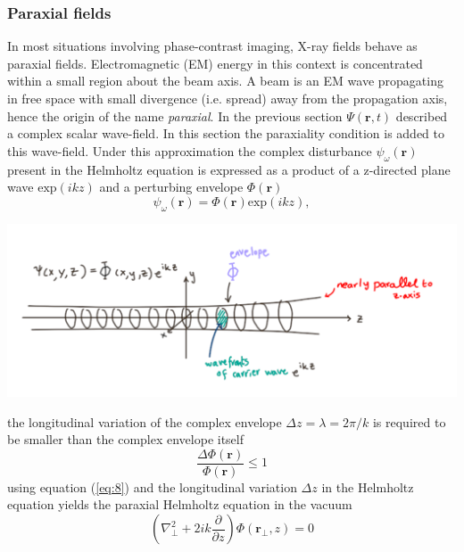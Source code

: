 \documentclass[10pt, a4paper, singlespacing]{report}
\newenvironment{Figure}
    {\par\medskip\noindent\minipage{\linewidth}}
    {\endminipage\par\medskip}
\begin{document}
\subsubsection{Paraxial fields}\label{Paraxial}
In most situations involving phase-contrast imaging, X-ray fields behave as paraxial fields. Electromagnetic (EM) energy in this context is concentrated within a small region about the beam axis. A beam is an EM wave propagating in free space with small divergence (i.e. spread) away from the propagation axis, hence the origin of the name \textit{paraxial}.
In the previous section $\Psi(\mathbf{r},t)$ described a complex scalar wave-field. In this section the paraxiality condition is added to this wave-field.
Under this approximation the complex disturbance $\psi_{\omega}(\mathbf{r})$ present in the Helmholtz equation is expressed as a product of a z-directed plane wave $\mathrm{exp}(ikz)$ and a perturbing envelope $\Phi(\mathbf{r})$\cite{PagsTutes}\cite{CH49}
\begin{equation}\label{eq:7}
\psi_{\omega}(\mathbf{r}) = \Phi(\mathbf{r})\mathrm{exp}(ikz),
\end{equation}
\begin{Figure}
\centering
\includegraphics[width=0.6\linewidth]{paraxial_beam.pdf}
\label{fig:1.1}
\end{Figure}
the longitudinal variation of the complex envelope $\Delta z = \lambda = 2 \pi/k$ is required to be smaller than the complex envelope itself
\begin{equation}\label{eq:8}
\frac{\Delta \Phi(\mathbf{r})}{\Phi(\mathbf{r})} \leq 1
\end{equation}
using equation (\ref{eq:8}) and the longitudinal variation $\Delta z$  in the Helmholtz equation yields the paraxial Helmholtz equation in the vacuum
\begin{equation}\label{eq:9}
\left (\nabla_{\perp}^{2} + 2 i k \frac{\partial }{\partial z}\right ) \Phi(\mathbf{r}_{\perp}, z) = 0
\end{equation}
\end{document}
